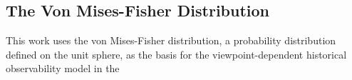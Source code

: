 \subsection{The Von Mises-Fisher Distribution}

This work uses the von Mises-Fisher distribution, a probability distribution defined on the unit sphere, as the basis for the viewpoint-dependent historical observability model in the 